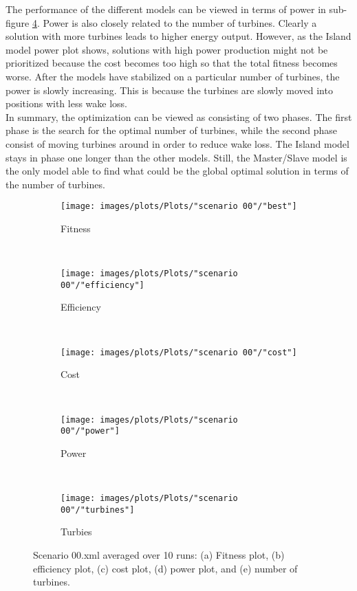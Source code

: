 \noindent The performance of the different models can be viewed in terms of power in sub-figure \ref{plot:power plot scenario 00}. Power is also closely related to the number of turbines. Clearly a solution with more turbines leads to higher energy output. However, as the Island model power plot shows, solutions with high power production might not be prioritized because the cost becomes too high so that the total fitness becomes worse. After the models have stabilized on a particular number of turbines, the power is slowly increasing. This is because the turbines are slowly moved into positions with less wake loss. \\


\noindent In summary, the optimization can be viewed as consisting of two phases. The first phase is the search for the optimal number of turbines, while the second phase consist of moving turbines around in order to reduce wake loss. The Island model stays in phase one longer than the other models. Still, the Master/Slave model is the only model able to find what could be the global optimal solution in terms of the number of turbines. \\

\begin{figure}[h!]
    \centering
      \begin{subfigure}[b]{0.45\textwidth}
        \texttt{[image: images/plots/Plots/"scenario 00"/"best"]}
        \caption{Fitness}
        \hfill
        \label{plot:fitness plot scenario 00}
    \end{subfigure}
    ~
      \begin{subfigure}[b]{0.45\textwidth}
        \texttt{[image: images/plots/Plots/"scenario 00"/"efficiency"]}
        \caption{Efficiency}
        \hfill
        \label{plot:efficiency plot scenario 00}
    \end{subfigure}
    ~
    \begin{subfigure}[b]{0.45\textwidth}
        \texttt{[image: images/plots/Plots/"scenario 00"/"cost"]}
        \caption{Cost}
        \hfill
        \label{plot:cost plot scenario 00}
    \end{subfigure}
    ~
    \begin{subfigure}[b]{0.45\textwidth}
        \texttt{[image: images/plots/Plots/"scenario 00"/"power"]}
        \caption{Power}
        \hfill
        \label{plot:power plot scenario 00}
    \end{subfigure}
    ~
    \begin{subfigure}[b]{0.45\textwidth}
        \texttt{[image: images/plots/Plots/"scenario 00"/"turbines"]}
        \caption{Turbies}
        \hfill
        \label{plot:turbines plot scenario 00}
    \end{subfigure}
    \caption{Scenario 00.xml averaged over 10 runs: (a) Fitness plot, (b) efficiency plot, (c) cost plot, (d) power plot, and (e) number of turbines.}
    \label{plot:scenario 00}
\end{figure}


